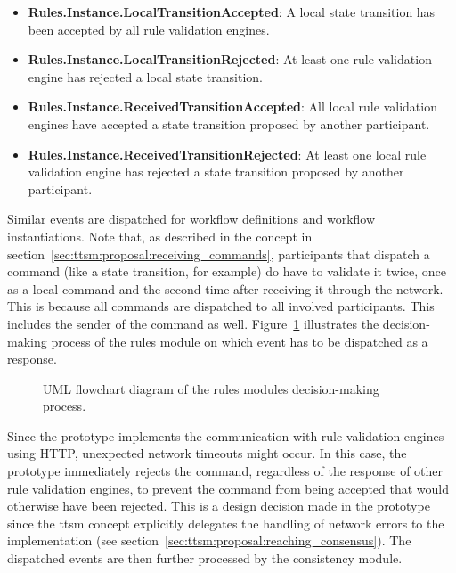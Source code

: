 \begin{itemize}
    \item \textbf{Rules.Instance.LocalTransitionAccepted}: A local state transition has been accepted by all rule validation engines.
    \item \textbf{Rules.Instance.LocalTransitionRejected}: At least one rule validation engine has rejected a local state transition.
    \item \textbf{Rules.Instance.ReceivedTransitionAccepted}: All local rule validation engines have accepted a state transition proposed by another participant.
    \item \textbf{Rules.Instance.ReceivedTransitionRejected}: At least one local rule validation engine has rejected a state transition proposed by another participant.
\end{itemize}

Similar events are dispatched for workflow definitions and workflow instantiations. Note that, as described in the concept in section~\ref{sec:ttsm:proposal:receiving_commands}, participants that dispatch a command (like a state transition, for example) do have to validate it twice, once as a local command and the second time after receiving it through the network. This is because all commands are dispatched to all involved participants. This includes the sender of the command as well. Figure~\ref{fig:prototype:rules_module_flowchart} illustrates the decision-making process of the rules module on which event has to be dispatched as a response.

\begin{figure}[h]
    \caption{UML flowchart diagram of the rules modules decision-making process.}
    \label{fig:prototype:rules_module_flowchart}
\end{figure}

Since the prototype implements the communication with rule validation engines using HTTP, unexpected network timeouts might occur. In this case, the prototype immediately rejects the command, regardless of the response of other rule validation engines, to prevent the command from being accepted that would otherwise have been rejected. This is a design decision made in the prototype since the \gls{ttsm} concept explicitly delegates the handling of network errors to the implementation (see section~\ref{sec:ttsm:proposal:reaching_consensus}). The dispatched events are then further processed by the consistency module.


